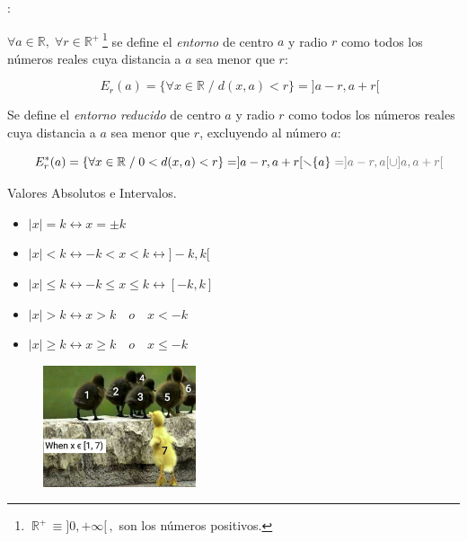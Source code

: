 \vspace{1cm}		
\begin{definition}[ Entorno]: 
	
$\forall a \in \mathbb R, \; \forall r \in \mathbb R^{+} \ $\footnote{ $\ \mathbb R^+\, \equiv ]0,+\infty[\, , $ son los números positivos. }
se define el \emph{entorno} de centro $a$ y radio $r$ como todos los números reales cuya distancia a $a$ sea menor que $r$:

$$\quad E_r(a)=\{ \forall x \in \mathbb R \;  / \; d(x,a)<r \}=]a-r,a+r[$$
		
\vspace{3mm} Se define el \emph{entorno reducido} de centro $a$ y radio $r$ como todos los números reales cuya distancia a $a$ sea menor que $r$, excluyendo al número $a$:
		
$$\quad E^*_r(a)=\{ \forall x \in \mathbb R \;  / \; 0<d(x,a)<r \}=]a-r,a+r[\smallsetminus \{a\} \small{\textcolor{gris}{\ = ]a-r,a[\cup ]a,a+r[}}$$
			
\end{definition}

\vspace{4mm} 

	
	\begin{myalertblock} {Valores Absolutos e Intervalos.}
		\begin{multicols}{2}
		\begin{itemize}
			\item $|x|=k \longleftrightarrow x=\pm k$
			\item $|x|<k \longleftrightarrow -k<x<k \longleftrightarrow ]-k,k[$
			\item $|x|\le k \longleftrightarrow -k\le x\le k \longleftrightarrow [-k,k]$
			\item $|x|> k \longleftrightarrow x>k\quad o \quad x<-k$
			\item $|x|\ge  k \longleftrightarrow x\ge k\quad o \quad x\le -k$
		\end{itemize}
		\begin{figure}[H]
			\centering
			\includegraphics[width=0.4\textwidth]{img-reales/reales09.png}
		\end{figure}
		\end{multicols}
	\end{myalertblock}
		
